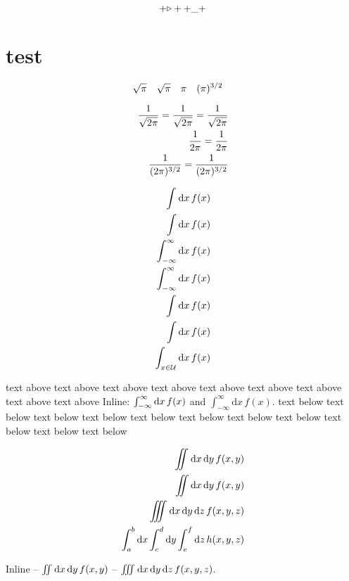 \documentclass{article}
\begin{document}
%
\begin{equation}
+\vcenter{\hbox{$\triangleright$}}+
+\_+
\end{equation}
%

\section{test}

%
\begin{equation}
  \nsqrt{\pi}\quad
  \nsqrt[1]{\pi}\quad
  \nsqrt[2]{\pi}\quad
  \nsqrt[3]{\pi}\quad
\end{equation}
%

\newcommand{\isqpi}[1][1]{\frac{1}{\nsqrt[#1]{2\pi}}}

%
\begin{align*}
  \isqpi = \isqpi[1] = \frac{1}{\sqrt{2\pi}}\\
  \isqpi[2] = \frac{1}{2\pi}\\
  \isqpi[3] = \frac{1}{(2\pi)^{3/2}}
\end{align*}
%

\pagebreak

\begin{align*}
  \idd{x} f(x)\\
  \int \mathrm{d}x\, f(x)\\
  \idd[-\infty][\infty]{x} f(x)\\
  \int_{-\infty}^{\infty}\mathrm{d}x\, f(x)\\
  \idd{x} f(x)\\
  \int \mathrm{d}x\, f(x)\\
  \idd[x \in \mathcal{U}]{x} f(x)\\
\end{align*}

text above
text above
text above
text above
text above
text above
text above
text above
text above
Inline: $\idd[-\infty][\infty]{x} f(x)$ and $\int_{-\infty}^{\infty}\mathrm{d}x\, f(x)$.
text below
text below
text below
text below
text below
text below
text below
text below
text below
text below
text below

\begin{align*}
  \iidd{x}{y} f(x,y)\\
  \iint \dd{x}\,\dd{y}\, f(x,y)\\
  \iiidd{x}{y}{z} f(x,y,z)\\
  \idd[a][b]{x}\!\idd[c][d]{y}\!\idd[e][f]{z} h(x, y, z)
\end{align*}

Inline -- $\iidd{x}{y} f(x,y)$ -- $\iiidd{x}{y}{z} f(x,y,z)$.
\end{document}
